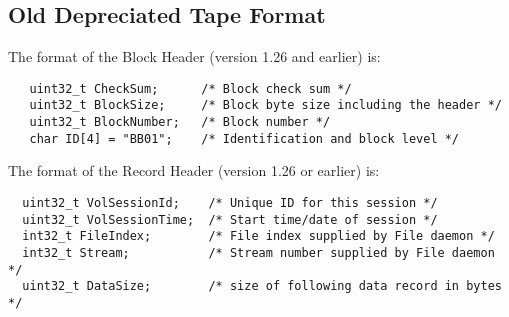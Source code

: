 \subsection*{Old Depreciated Tape Format}

The format of the Block Header (version 1.26 and earlier) is: 

\footnotesize
\begin{verbatim}
   uint32_t CheckSum;      /* Block check sum */
   uint32_t BlockSize;     /* Block byte size including the header */
   uint32_t BlockNumber;   /* Block number */
   char ID[4] = "BB01";    /* Identification and block level */
\end{verbatim}
\normalsize

The format of the Record Header (version 1.26 or earlier) is: 

\footnotesize
\begin{verbatim}
  uint32_t VolSessionId;    /* Unique ID for this session */
  uint32_t VolSessionTime;  /* Start time/date of session */
  int32_t FileIndex;        /* File index supplied by File daemon */
  int32_t Stream;           /* Stream number supplied by File daemon */
  uint32_t DataSize;        /* size of following data record in bytes */
\end{verbatim}
\normalsize

